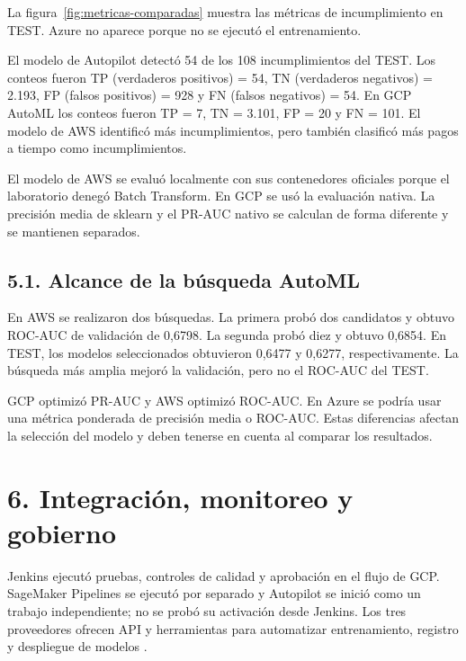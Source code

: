 La figura~\ref{fig:metricas-comparadas} muestra las métricas de incumplimiento en TEST. Azure no aparece porque no se ejecutó el entrenamiento.


El modelo de Autopilot detectó 54 de los 108 incumplimientos del TEST. Los conteos fueron TP (verdaderos positivos) = 54, TN (verdaderos negativos) = 2.193, FP (falsos positivos) = 928 y FN (falsos negativos) = 54. En GCP AutoML los conteos fueron TP = 7, TN = 3.101, FP = 20 y FN = 101. El modelo de AWS identificó más incumplimientos, pero también clasificó más pagos a tiempo como incumplimientos.

El modelo de AWS se evaluó localmente con sus contenedores oficiales porque el laboratorio denegó Batch Transform. En GCP se usó la evaluación nativa. La precisión media de sklearn y el PR-AUC nativo se calculan de forma diferente y se mantienen separados.

\subsection{5.1. Alcance de la búsqueda AutoML}

En AWS se realizaron dos búsquedas. La primera probó dos candidatos y obtuvo ROC-AUC de validación de 0,6798. La segunda probó diez y obtuvo 0,6854. En TEST, los modelos seleccionados obtuvieron 0,6477 y 0,6277, respectivamente. La búsqueda más amplia mejoró la validación, pero no el ROC-AUC del TEST.

GCP optimizó PR-AUC y AWS optimizó ROC-AUC. En Azure se podría usar una métrica ponderada de precisión media o ROC-AUC. Estas diferencias afectan la selección del modelo y deben tenerse en cuenta al comparar los resultados.

\section{6. Integración, monitoreo y gobierno}

Jenkins ejecutó pruebas, controles de calidad y aprobación en el flujo de GCP. SageMaker Pipelines se ejecutó por separado y Autopilot se inició como un trabajo independiente; no se probó su activación desde Jenkins. Los tres proveedores ofrecen API y herramientas para automatizar entrenamiento, registro y despliegue de modelos \cite{aws-pipelines,gcp-pipelines,azure-mlops}.

